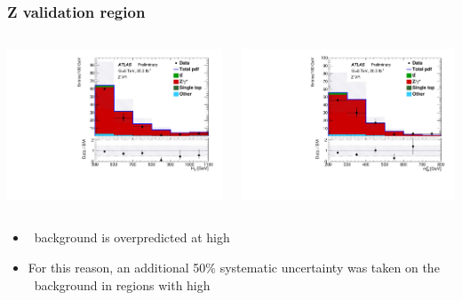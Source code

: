 \documentclass[10pt, svgnames]{beamer}
\begin{document}
\begin{frame}
  \frametitle{Z validation region}
  \begin{columns}
    \begin{block}{\HT}
      \includegraphics[width=\textwidth]{figures/blstop/vr_Z_ht_signal.pdf}
    \end{block}
    \begin{block}{\MBL}
      \includegraphics[width=\textwidth]{figures/blstop/vr_Z_mbl_0.pdf}
    \end{block}
  \end{columns}
  \begin{itemize}
    \item \ZGAMMA\ background is overpredicted at high \HT
    \item For this reason, an additional 50\% systematic uncertainty was taken
      on the \ZGAMMA\ background in regions with high \HT
  \end{itemize}
\end{frame}
\end{document}
